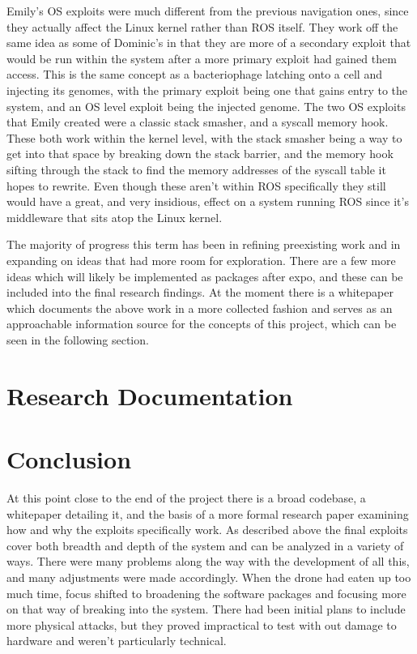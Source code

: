 \documentclass[IEEEtran,letterpaper,10pt,notitlepage,draftclsnofoot,onecolumn]{article}
\begin{document}
Emily's OS exploits were much different from the previous navigation ones, since they actually affect the Linux kernel rather than ROS itself.
They work off the same idea as some of Dominic's in that they are more of a secondary exploit that would be run within the system after a more primary exploit had gained them access.
This is the same concept as a bacteriophage latching onto a cell and injecting its genomes, with the primary exploit being one that gains entry to the system, and an OS level exploit being the injected genome.
The two OS exploits that Emily created were a classic stack smasher, and a syscall memory hook.
These both work within the kernel level, with the stack smasher being a way to get into that space by breaking down the stack barrier, and the memory hook sifting through the stack to find the memory addresses of the syscall table it hopes to rewrite.
Even though these aren't within ROS specifically they still would have a great, and very insidious, effect on a system running ROS since it's middleware that sits atop the Linux kernel.



The majority of progress this term has been in refining preexisting work and in expanding on ideas that had more room for exploration.
There are a few more ideas which will likely be implemented as packages after expo, and these can be included into the final research findings.
At the moment there is a whitepaper which documents the above work in a more collected fashion and serves as an approachable information source for the concepts of this project, which can be seen in the following section.

\section{Research Documentation}



\section{Conclusion}
At this point close to the end of the project there is a broad codebase, a whitepaper detailing it, and the basis of a more formal research paper examining how and why the exploits specifically work.
As described above the final exploits cover both breadth and depth of the system and can be analyzed in a variety of ways.
There were many problems along the way with the development of all this, and many adjustments were made accordingly.
When the drone had eaten up too much time, focus shifted to broadening the software packages and focusing more on that way of breaking into the system.
There had been initial plans to include more physical attacks, but they proved impractical to test with out damage to hardware and weren't particularly technical.
\end{document}
